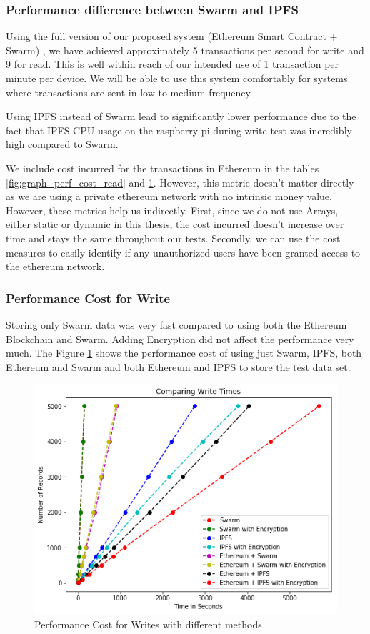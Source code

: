 \documentclass[11pt,openright]{report}
\begin{document}
\subsubsection{Performance difference between Swarm and IPFS}
Using the full version of our proposed system (Ethereum Smart Contract + Swarm) , we have achieved approximately 5 transactions per second for write and 9 for read. This is well within reach of our intended use of 1 transaction per minute per device. We will be able to use this system comfortably for systems where transactions are sent in low to medium frequency.

Using IPFS instead of Swarm lead to significantly lower performance due to the fact that IPFS CPU usage on the raspberry pi during write test was incredibly high compared to Swarm.

We include cost incurred for the transactions in Ethereum in the tables \ref{fig:graph_perf_cost_read} and \ref{fig:graph_perf_cost_write}. However, this metric doesn't matter directly as we are using a private ethereum network with no intrinsic money value. However, these metrics help us indirectly. First, since we do not use Arrays, either static or dynamic in this thesis, the cost incurred doesn't increase over time and stays the same throughout our tests. Secondly, we can use the cost measures to easily identify if any unauthorized users have been granted access to the ethereum network.

\subsubsection{Performance Cost for Write}
Storing only Swarm data was very fast compared to using both the Ethereum Blockchain and Swarm. Adding Encryption did not affect the performance very much. The Figure \ref{fig:graph_perf_cost_write} shows the performance cost of using just Swarm, IPFS, both Ethereum and Swarm and both Ethereum and IPFS to store the test data set.

\begin{figure}
	\centering
	\includegraphics[scale=1]{results/Eth_IPFS_Swarm_Write.png}
	\caption{Performance Cost for Writes with different methods}
	\label{fig:graph_perf_cost_write}
\end{figure}
\end{document}
